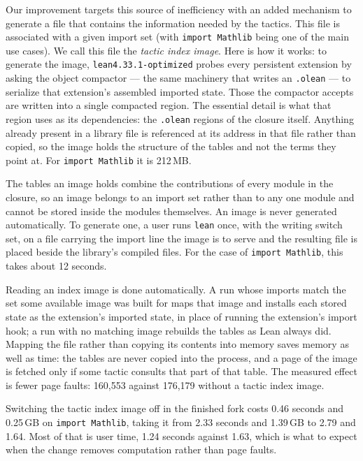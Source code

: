 \documentclass{article}
\newcommand{\Lean}{Lean\xspace}      %
\newcommand{\lean}{\texttt{lean}\xspace}      %
\newcommand{\altlean}{\texttt{lean4.33.1-\allowbreak optimized}\xspace}
\begin{document}
Our improvement targets this source of inefficiency with an added mechanism to generate a file that contains the information needed by the tactics. This file is associated with a given import set (with \texttt{import Mathlib} being one of the main use cases).
We call this file the \emph{tactic index image}.
Here is how it works: to generate the image, \altlean probes every persistent extension by asking the object compactor --- the same machinery that writes an \texttt{.olean} --- to serialize that extension's assembled imported state. Those the compactor accepts are written into a single compacted region. The essential detail is what that region uses as its dependencies: the \texttt{.olean} regions of the closure itself. Anything already present in a library file is referenced at its address in that file rather than copied, so the image holds the structure of the tables and not the terms they point at. For \texttt{import Mathlib} it is 212\,MB.

The tables an image holds combine the contributions of every module in the closure, so an image belongs to an import set rather than to any one module and cannot be stored inside the modules themselves. An image is never generated automatically. To generate one, a user runs \lean once, with the writing switch set, on a file carrying the import line the image is to serve and the resulting file is placed beside the library's compiled files.  For the case of \texttt{import Mathlib}, this takes about 12 seconds.

Reading an index image is done automatically. A run whose imports match the set some available image was built for maps that image and installs each stored state as the extension's imported state, in place of running the extension's import hook; a run with no matching image rebuilds the tables as \Lean always did. Mapping the file rather than copying its contents into memory saves memory as well as time: the tables are never copied into the process, and a page of the image is fetched only if some tactic consults that part of that table. The measured effect is fewer page faults: 160{,}553 against 176{,}179 without a tactic index image.

Switching the tactic index image off in the finished fork costs 0.46 seconds and 0.25\,GB on \texttt{import Mathlib}, taking it from 2.33 seconds and 1.39\,GB to 2.79 and 1.64. Most of that is user time, 1.24 seconds against 1.63, which is what to expect when the change removes computation rather than page faults.
\end{document}
